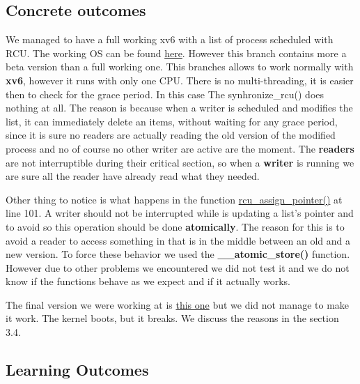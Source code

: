 \documentclass[10pt,a4]{article}
\begin{document}
\subsection{Concrete outcomes}

We managed to have a full working xv6 with a list of process scheduled with RCU. 
The working OS can be found \href{https://github.com/salvoM/xv6-riscv-rcu/tree/working_version}{here}. 
However this branch contains more a beta version than a full working one. 
This branches allows to work normally with \textbf{xv6}, however it runs with only one CPU. There is no multi-threading, 
it is easier then to check for the grace period. In this case The synhronize\_rcu() does nothing at all. 
The reason is because when a writer is scheduled and modifies the list, it can immediately delete an items, 
without waiting for any grace period, since it is sure no readers are actually reading the old version of the 
modified process and no of course no other writer are active are the moment. 
The \textbf{readers} are not interruptible during their critical section, 
so when a \textbf{writer} is running we are sure all the reader have already read what they needed.

Other thing to notice is what happens in the function 
\href{https://github.com/salvoM/xv6-riscv-rcu/blob/final/kernel/list_proc.c}{rcu\_assign\_pointer()} at line 101. 
A writer should not be interrupted while is updating a list's pointer and to avoid so this operation should be done \textbf{atomically}. 
The reason for this is to avoid a reader to access something in that is in the middle between an old and a new version. 
To force these behavior we used the \textbf{\_\_atomic\_store()} function. 
However due to other problems we encountered we did not test it and we do not know if the functions behave as we expect 
and if it actually works.


The final version we were working at is \href{https://github.com/salvoM/xv6-riscv-rcu/tree/definitive}{this one} 
but we did not manage to make it work. The kernel boots, but it breaks. We discuss the reasons in the section 3.4.


\subsection{Learning Outcomes}
\end{document}
